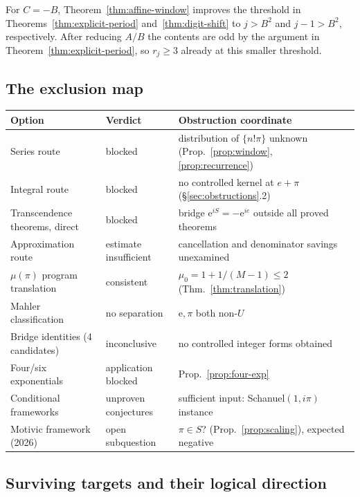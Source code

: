 \documentclass[11pt]{amsart}
\theoremstyle{definition}
\theoremstyle{remark}
\numberwithin{equation}{section}
\newcommand{\irr}{\mu}
\newcommand{\ee}{\mathrm{e}}
\begin{document}
For $C=-B$, Theorem~\ref{thm:affine-window} improves the
threshold in Theorems~\ref{thm:explicit-period} and~\ref{thm:digit-shift}
to $j>B^2$ and $j-1>B^2$, respectively. After reducing $A/B$
the contents are odd by the argument in Theorem~\ref{thm:explicit-period},
so $r_j\ge3$ already at this smaller threshold.

\subsection{The exclusion map}

\begin{center}
\small\begin{tabularx}{\textwidth}{@{}p{}p{}X@{}}
\toprule
Option & Verdict & Obstruction coordinate \\
\midrule
Series route & blocked & distribution of $\{n!\pi\}$ unknown (Prop.~\ref{prop:window}, \ref{prop:recurrence}) \\
Integral route & blocked & no controlled kernel at $e+\pi$ (\S\ref{sec:obstructions}.2) \\
Transcendence theorems, direct & blocked & bridge $\ee^{iS}=-\ee^{ie}$ outside all proved theorems \\
Approximation route & estimate insufficient & cancellation and denominator savings unexamined \\
$\irr(\pi)$ program translation & consistent & $\irr_0=1+1/(M-1)\le2$ (Thm.~\ref{thm:translation}) \\
Mahler classification & no separation & $\ee,\pi$ both non-$U$ \\
Bridge identities (4 candidates) & inconclusive & no controlled integer forms obtained \\
Four/six exponentials & application blocked & Prop.~\ref{prop:four-exp} \\
Conditional frameworks & unproven conjectures & sufficient input: Schanuel$(1,i\pi)$ instance \\
Motivic framework (2026) & open subquestion & $\pi\in S$? (Prop.~\ref{prop:scaling}), expected negative \\
\bottomrule
\end{tabularx}
\end{center}

\subsection{Surviving targets and their logical direction}
\end{document}

